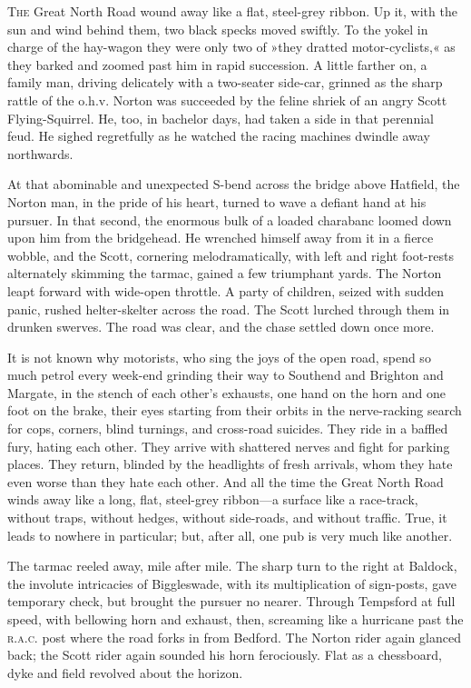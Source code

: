 	
	
\lettrine[lines=4]{T}{he} Great North Road wound away like a flat, steel-grey ribbon. Up it, with the sun and wind behind them, two black specks moved swiftly. To the yokel in charge of the hay-wagon they were only two of »they dratted motor-cyclists,« as they barked and zoomed past him in rapid succession. A little farther on, a family man, driving delicately with a two-seater side-car, grinned as the sharp rattle of the o.h.v. Norton was succeeded by the feline shriek of an angry Scott Flying-Squirrel. He, too, in bachelor days, had taken a side in that perennial feud. He sighed regretfully as he watched the racing machines dwindle away northwards.

At that abominable and unexpected S-bend across the bridge above Hatfield, the Norton man, in the pride of his heart, turned to wave a defiant hand at his pursuer. In that second, the enormous bulk of a loaded charabanc loomed down upon him from the bridgehead. He wrenched himself away from it in a fierce wobble, and the Scott, cornering melodramatically, with left and right foot-rests alternately skimming the tarmac, gained a few triumphant yards. The Norton leapt forward with wide-open throttle. A party of children, seized with sudden panic, rushed helter-skelter across the road. The Scott lurched through them in drunken swerves. The road was clear, and the chase settled down once more.

It is not known why motorists, who sing the joys of the open road, spend so much petrol every week-end grinding their way to Southend and Brighton and Margate, in the stench of each other's exhausts, one hand on the horn and one foot on the brake, their eyes starting from their orbits in the nerve-racking search for cops, corners, blind turnings, and cross-road suicides. They ride in a baffled fury, hating each other. They arrive with shattered nerves and fight for parking places. They return, blinded by the headlights of fresh arrivals, whom they hate even worse than they hate each other. And all the time the Great North Road winds away like a long, flat, steel-grey ribbon—a surface like a race-track, without traps, without hedges, without side-roads, and without traffic. True, it leads to nowhere in particular; but, after all, one pub is very much like another.

The tarmac reeled away, mile after mile. The sharp turn to the right at Baldock, the involute intricacies of Biggleswade, with its multiplication of sign-posts, gave temporary check, but brought the pursuer no nearer. Through Tempsford at full speed, with bellowing horn and exhaust, then, screaming like a hurricane past the \textsc{r.a.c.} post where the road forks in from Bedford. The Norton rider again glanced back; the Scott rider again sounded his horn ferociously. Flat as a chessboard, dyke and field revolved about the horizon.

